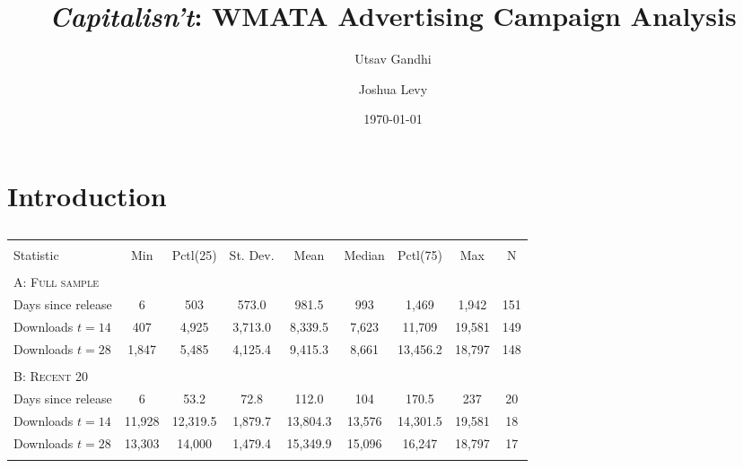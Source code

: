 \documentclass[11pt, letterpaper, twoside]{article}
\title{\singlespacing\textit{Capitalisn't}: WMATA Advertising Campaign Analysis}
\author{
   Utsav Gandhi
   \and
   Joshua Levy
}
\date{\today}
\begin{document}
\begin{titlepage}   
    \maketitle
    \thispagestyle{empty}
\end{titlepage}





\newpage
{}

\section{Introduction}

\begin{table}[!htbp] \centering 
    \caption{} 
    \label{} 
  \begin{tabular}{@{\extracolsep{5pt}}lcccccccc} 
  \\[-1.8ex]\hline \\[-1.8ex]
  Statistic & \multicolumn{1}{c}{Min} & \multicolumn{1}{c}{Pctl(25)} & \multicolumn{1}{c}{St. Dev.} & \multicolumn{1}{c}{Mean} & \multicolumn{1}{c}{Median} & \multicolumn{1}{c}{Pctl(75)} & \multicolumn{1}{c}{Max} & \multicolumn{1}{c}{N} \\
  \hline 
  \hline \\[-1.8ex]
  \textsc{A: Full sample} & & & & & & & & \\
  Days since release & 6 & 503 & 573.0 & 981.5 & 993 & 1,469 & 1,942 & 151 \\
  Downloads $t=14$ & 407 & 4,925 & 3,713.0 & 8,339.5 & 7,623 & 11,709 & 19,581 & 149 \\ 
  Downloads $t=28$ & 1,847 & 5,485 & 4,125.4 & 9,415.3 & 8,661 & 13,456.2 & 18,797 & 148 \\
  \hline \\[-1.8ex]
  \textsc{B: Recent 20} & & & & & & & & \\
  Days since release & 6 & 53.2 & 72.8 & 112.0 & 104 & 170.5 & 237 & 20 \\
  Downloads $t=14$ & 11,928 & 12,319.5 & 1,879.7 & 13,804.3 & 13,576 & 14,301.5 & 19,581 & 18 \\ 
  Downloads $t=28$ & 13,303 & 14,000 & 1,479.4 & 15,349.9 & 15,096 & 16,247 & 18,797 & 17 \\
  \hline
  \hline \\[-1.8ex] 
  \end{tabular}
\end{table}
\end{document}
